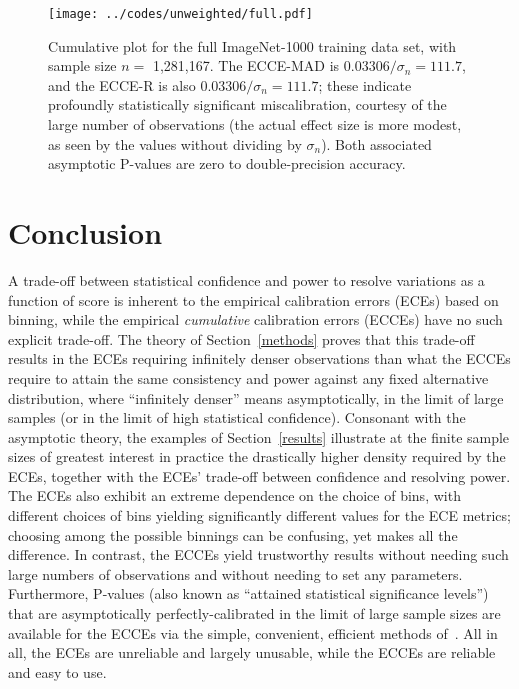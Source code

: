 \documentclass{article}
\newlength{\imsize}
\begin{document}
\begin{figure}
\begin{center}
\parbox{\imsize}{\texttt{[image: ../codes/unweighted/full.pdf]}}
\end{center}
\caption{Cumulative plot for the full ImageNet-1000 training data set,
         with sample size $n =$ 1,281,167.
         The ECCE-MAD is $0.03306 / \sigma_n = 111.7$,
         and the ECCE-R is also $0.03306 / \sigma_n = 111.7$;
         these indicate profoundly statistically significant miscalibration,
         courtesy of the large number of observations
         (the actual effect size is more modest, as seen by the values
         without dividing by $\sigma_n$). Both associated asymptotic P-values
         are zero to double-precision accuracy.
}
\label{imagenetcum}
\end{figure}



\section{Conclusion}
\label{conclusion}

A trade-off between statistical confidence and power to resolve variations
as a function of score is inherent to the empirical calibration errors (ECEs)
based on binning, while the empirical {\it cumulative} calibration errors
(ECCEs) have no such explicit trade-off. The theory of Section~\ref{methods}
proves that this trade-off results in the ECEs requiring
infinitely denser observations than what the ECCEs require to attain
the same consistency and power against any fixed alternative distribution,
where ``infinitely denser'' means asymptotically, in the limit of large samples
(or in the limit of high statistical confidence).
Consonant with the asymptotic theory, the examples of Section~\ref{results}
illustrate at the finite sample sizes of greatest interest in practice
the drastically higher density required by the ECEs,
together with the ECEs' trade-off between confidence and resolving power.
The ECEs also exhibit an extreme dependence on the choice of bins,
with different choices of bins yielding significantly different values
for the ECE metrics; choosing among the possible binnings can be confusing,
yet makes all the difference. In contrast, the ECCEs yield trustworthy results
without needing such large numbers of observations
and without needing to set any parameters. Furthermore, P-values
(also known as ``attained statistical significance levels'')
that are asymptotically perfectly-calibrated in the limit of large sample sizes
are available for the ECCEs via the simple, convenient, efficient methods
of~\cite{tygert_pvals}. All in all, the ECEs are unreliable
and largely unusable, while the ECCEs are reliable and easy to use.
\end{document}
